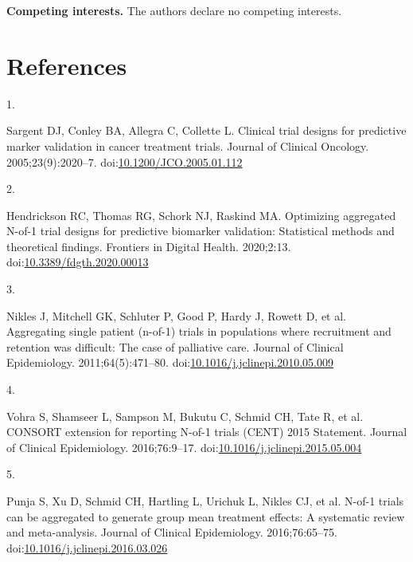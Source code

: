 \documentclass[
  11pt,
]{article}
\newlength{\cslhangindent}
\newlength{\csllabelwidth}
\newenvironment{CSLReferences}[2] %
 {\begin{list}{}{%
  \setlength{\itemindent}{0pt}
  \setlength{\leftmargin}{0pt}
  \setlength{\parsep}{0pt}
  \ifodd #1
   \setlength{\leftmargin}{\cslhangindent}
   \setlength{\itemindent}{-1\cslhangindent}
  \fi
  \setlength{\itemsep}{#2\baselineskip}}}
 {\end{list}}
\newcommand{\CSLLeftMargin}[1]{\parbox[t]{\csllabelwidth}{\strut#1\strut}}
\newcommand{\CSLRightInline}[1]{\parbox[t]{\linewidth - \csllabelwidth}{\strut#1\strut}}
\begin{document}
\textbf{Competing interests.} The authors declare no competing interests.

\section*{References}\label{references}

\protect{}\label{refs}
\begin{CSLReferences}{0}{1}
\CSLLeftMargin{1. }%
\CSLRightInline{Sargent DJ, Conley BA, Allegra C, Collette L. Clinical trial designs for predictive marker validation in cancer treatment trials. Journal of Clinical Oncology. 2005;23(9):2020--7. doi:\href{https://doi.org/10.1200/JCO.2005.01.112}{10.1200/JCO.2005.01.112}}

\CSLLeftMargin{2. }%
\CSLRightInline{Hendrickson RC, Thomas RG, Schork NJ, Raskind MA. Optimizing aggregated {N}-of-1 trial designs for predictive biomarker validation: Statistical methods and theoretical findings. Frontiers in Digital Health. 2020;2:13. doi:\href{https://doi.org/10.3389/fdgth.2020.00013}{10.3389/fdgth.2020.00013}}

\CSLLeftMargin{3. }%
\CSLRightInline{Nikles J, Mitchell GK, Schluter P, Good P, Hardy J, Rowett D, et al. Aggregating single patient (n-of-1) trials in populations where recruitment and retention was difficult: The case of palliative care. Journal of Clinical Epidemiology. 2011;64(5):471--80. doi:\href{https://doi.org/10.1016/j.jclinepi.2010.05.009}{10.1016/j.jclinepi.2010.05.009}}

\CSLLeftMargin{4. }%
\CSLRightInline{Vohra S, Shamseer L, Sampson M, Bukutu C, Schmid CH, Tate R, et al. {CONSORT} extension for reporting {N}-of-1 trials ({CENT}) 2015 {S}tatement. Journal of Clinical Epidemiology. 2016;76:9--17. doi:\href{https://doi.org/10.1016/j.jclinepi.2015.05.004}{10.1016/j.jclinepi.2015.05.004}}

\CSLLeftMargin{5. }%
\CSLRightInline{Punja S, Xu D, Schmid CH, Hartling L, Urichuk L, Nikles CJ, et al. {N}-of-1 trials can be aggregated to generate group mean treatment effects: A systematic review and meta-analysis. Journal of Clinical Epidemiology. 2016;76:65--75. doi:\href{https://doi.org/10.1016/j.jclinepi.2016.03.026}{10.1016/j.jclinepi.2016.03.026}}


\end{CSLReferences}
\end{document}
